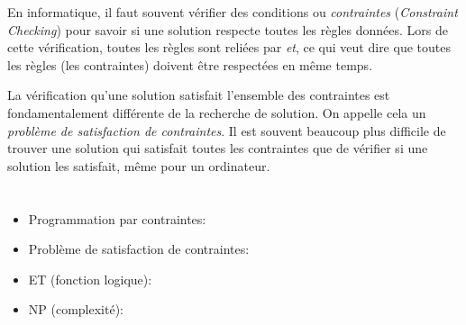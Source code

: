 {{En informatique, il faut souvent vérifier des conditions ou \emph{contraintes} (\emph{Constraint Checking}) pour savoir si une solution respecte toutes les règles données. Lors de cette vérification, toutes les règles sont reliées par \emph{et}, ce qui veut dire que toutes les règles (les contraintes) doivent être respectées en même temps.

La vérification qu’une solution satisfait l’ensemble des contraintes est fondamentalement différente de la recherche de solution. On appelle cela un \emph{problème de satisfaction de contraintes}. Il est souvent beaucoup plus difficile de trouver une solution qui satisfait toutes les contraintes que de vérifier si une solution les satisfait, même pour un ordinateur.



\section*{\BrochureWebsitesAndKeywords}
{\raggedright
\begin{itemize}
  \item Programmation par contraintes: \href{https://fr.wikipedia.org/wiki/Programmation_par_contraintes}{}
  \item Problème de satisfaction de contraintes: \href{https://fr.wikipedia.org/wiki/Probl\%C3\%A8me_de_satisfaction_de_contraintes}{}
  \item ET (fonction logique): \href{https://fr.wikipedia.org/wiki/Fonction_ET}{}
  \item NP (complexité): \href{https://fr.wikipedia.org/wiki/NP_(complexit\%C3\%A9)}{}
\end{itemize}


}

}{}

\def\AuthorChoB{} %
\def\AuthorKimS{} %
\def\AuthorKimJ{} %
\def\AuthorKimH{} %
\def\AuthorTruuA{} %
\def\AuthorNemethA{} %
\def\AuthorPluharZ{} %
\def\AuthorEscherleN{} %
\def\AuthorPelletE{} %

\newpage}{}
